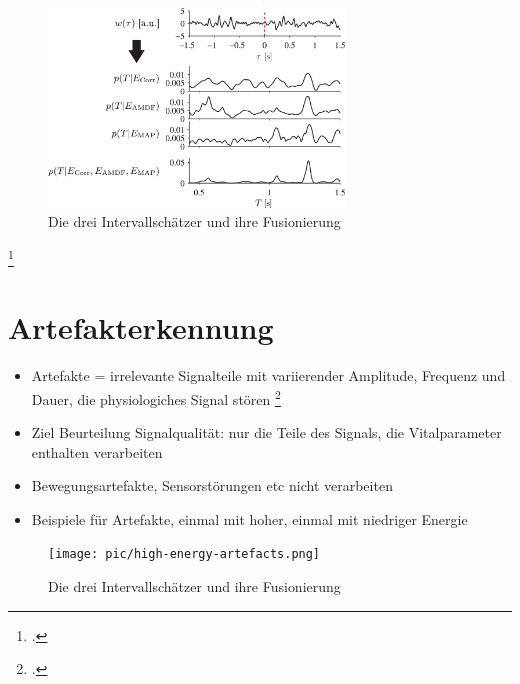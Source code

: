 	\begin{figure}[H]
		\centering
		\includegraphics[width=0.7\textwidth]{pic/estimator-fusion.png}
		\caption[Intervallschätzer nach \citeauthor{Bruser2013}]{Die drei Intervallschätzer und ihre Fusionierung}
		\label{fig:estimator-fusion}
	\end{figure}
	
	\footcites[Vgl. zu diesem Absatz][]{Bruser2013}{Zink2017}

\section{Artefakterkennung}

	\begin{itemize}
		\item Artefakte = irrelevante Signalteile mit variierender Amplitude, Frequenz und Dauer, die physiologiches Signal stören \footcite{Nizami2013}
		\item Ziel Beurteilung Signalqualität: nur die Teile des Signals, die Vitalparameter enthalten verarbeiten
		\item Bewegungsartefakte, Sensorstörungen etc nicht verarbeiten
		\item Beispiele für Artefakte, einmal mit hoher, einmal mit niedriger Energie
	\end{itemize}
	
	\begin{figure}[H]
		\centering
		\texttt{[image: pic/high-energy-artefacts.png]}
		\caption[Intervallschätzer nach \citeauthor{Bruser2013}]{Die drei Intervallschätzer und ihre Fusionierung}
		\label{fig:estimator-fusion}
	\end{figure}
	
